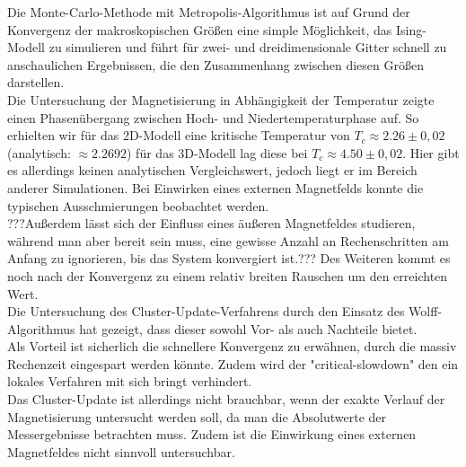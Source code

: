 
Die Monte-Carlo-Methode mit Metropolis-Algorithmus ist auf Grund der Konvergenz der makroskopischen Größen eine simple Möglichkeit, das Ising-Modell zu simulieren und führt für zwei- und dreidimensionale Gitter schnell zu anschaulichen Ergebnissen, die den Zusammenhang zwischen diesen Größen darstellen.\\
Die Untersuchung der Magnetisierung in Abhängigkeit der Temperatur zeigte einen Phasenübergang zwischen Hoch- und Niedertemperaturphase auf. So erhielten wir für das 2D-Modell eine kritische Temperatur von $ T_c \approx 2.26 \pm 0,02$ (analytisch: $\approx 2.2692$) für das 3D-Modell lag diese bei $ T_c \approx 4.50 \pm 0,02$. Hier gibt es allerdings keinen analytischen Vergleichswert, jedoch liegt er im Bereich anderer Simulationen. Bei Einwirken eines externen Magnetfelds konnte die typischen Ausschmierungen beobachtet werden.\\
???Außerdem lässt sich der Einfluss eines äußeren Magnetfeldes studieren, während man aber bereit sein muss, eine gewisse Anzahl an Rechenschritten am Anfang zu ignorieren, bis das System konvergiert ist.??? Des Weiteren kommt es noch nach der Konvergenz zu einem relativ breiten Rauschen um den erreichten Wert.\\
Die Untersuchung des Cluster-Update-Verfahrens durch den Einsatz des Wolff-Algorithmus hat gezeigt, dass dieser sowohl Vor- als auch Nachteile bietet.\\
Als Vorteil ist sicherlich die schnellere Konvergenz zu erwähnen, durch die massiv Rechenzeit eingespart werden könnte. Zudem wird der "critical-slowdown" den ein lokales Verfahren mit sich bringt verhindert.\\
Das Cluster-Update ist allerdings nicht brauchbar, wenn der exakte Verlauf der Magnetisierung untersucht werden soll, da man die Absolutwerte der Messergebnisse betrachten muss. Zudem ist die Einwirkung eines externen Magnetfeldes nicht sinnvoll untersuchbar.
 
